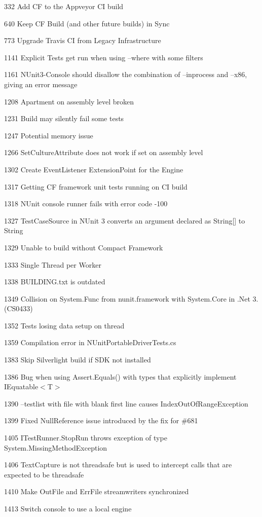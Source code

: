 \begin{DoxyItemize}
\item 332 Add CF to the Appveyor CI build
\item 640 Keep CF Build (and other future builds) in Sync
\item 773 Upgrade Travis CI from Legacy Infrastructure
\item 1141 Explicit Tests get run when using --where with some filters
\item 1161 N\+Unit3-\/\+Console should disallow the combination of --inprocess and --x86, giving an error message
\item 1208 Apartment on assembly level broken
\item 1231 Build may silently fail some tests
\item 1247 Potential memory issue
\item 1266 Set\+Culture\+Attribute does not work if set on assembly level
\item 1302 Create Event\+Listener Extension\+Point for the Engine
\item 1317 Getting CF framework unit tests running on CI build
\item 1318 N\+Unit console runner fails with error code -\/100
\item 1327 Test\+Case\+Source in N\+Unit 3 converts an argument declared as String[] to String
\item 1329 Unable to build without Compact Framework
\item 1333 Single Thread per Worker
\item 1338 B\+U\+I\+L\+D\+I\+N\+G.\+txt is outdated
\item 1349 Collision on System.\+Func from nunit.\+framework with System.\+Core in .Net 3. (C\+S0433)
\item 1352 Tests losing data setup on thread
\item 1359 Compilation error in N\+Unit\+Portable\+Driver\+Tests.\+cs
\item 1383 Skip Silverlight build if S\+DK not installed
\item 1386 Bug when using Assert.\+Equals() with types that explicitly implement {\ttfamily I\+Equatable$<$T$>$}
\item 1390 --testlist with file with blank first line causes Index\+Out\+Of\+Range\+Exception
\item 1399 Fixed Null\+Reference issue introduced by the fix for \#681
\item 1405 I\+Test\+Runner.\+Stop\+Run throws exception of type \textquotesingle{}System.\+Missing\+Method\+Exception\textquotesingle{}
\item 1406 Text\+Capture is not threadsafe but is used to intercept calls that are expected to be threadsafe
\item 1410 Make Out\+File and Err\+File streamwriters synchronized
\item 1413 Switch console to use a local engine
\end{DoxyItemize}

